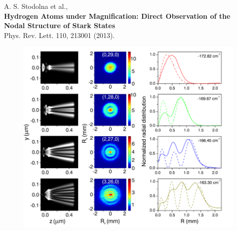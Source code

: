 A. S. Stodolna et al., \\
\textbf{Hydrogen Atoms under Magnification: Direct Observation of the Nodal Structure of Stark States} \\
Phys. Rev. Lett. 110, 213001 (2013).

\begin{figure}[h]
    \centering
    \includegraphics[height=0.68\textwidth]{figures/3.png}
\end{figure}